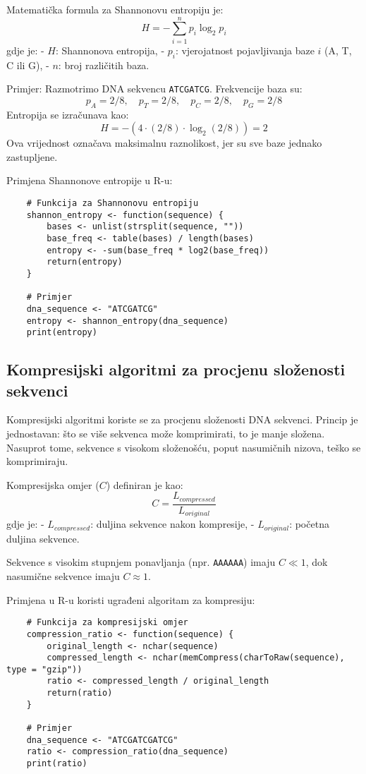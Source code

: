 \documentclass[10pt,a4paper,twoside]{article}
\begin{document}
Matematička formula za Shannonovu entropiju je:
\[
H = -\sum_{i=1}^n p_i \log_2 p_i
\]
gdje je:
- \( H \): Shannonova entropija,
- \( p_i \): vjerojatnost pojavljivanja baze \( i \) (A, T, C ili G),
- \( n \): broj različitih baza.

Primjer: Razmotrimo DNA sekvencu \texttt{ATCGATCG}. Frekvencije baza su:
\[
p_A = 2/8, \quad p_T = 2/8, \quad p_C = 2/8, \quad p_G = 2/8
\]
Entropija se izračunava kao:
\[
H = -(4 \cdot (2/8) \cdot \log_2 (2/8)) = 2
\]
Ova vrijednost označava maksimalnu raznolikost, jer su sve baze jednako zastupljene.

Primjena Shannonove entropije u R-u:
\begin{verbatim}
	# Funkcija za Shannonovu entropiju
	shannon_entropy <- function(sequence) {
		bases <- unlist(strsplit(sequence, ""))
		base_freq <- table(bases) / length(bases)
		entropy <- -sum(base_freq * log2(base_freq))
		return(entropy)
	}
	
	# Primjer
	dna_sequence <- "ATCGATCG"
	entropy <- shannon_entropy(dna_sequence)
	print(entropy)
\end{verbatim}

\subsection*{Kompresijski algoritmi za procjenu složenosti sekvenci}

Kompresijski algoritmi koriste se za procjenu složenosti DNA sekvenci. Princip je jednostavan: što se više sekvenca može komprimirati, to je manje složena. Nasuprot tome, sekvence s visokom složenošću, poput nasumičnih nizova, teško se komprimiraju.

Kompresijska omjer (\( C \)) definiran je kao:
\[
C = \frac{L_{compressed}}{L_{original}}
\]
gdje je:
- \( L_{compressed} \): duljina sekvence nakon kompresije,
- \( L_{original} \): početna duljina sekvence.

Sekvence s visokim stupnjem ponavljanja (npr. \texttt{AAAAAA}) imaju \( C \ll 1 \), dok nasumične sekvence imaju \( C \approx 1 \).

Primjena u R-u koristi ugrađeni algoritam za kompresiju:
\begin{verbatim}
	# Funkcija za kompresijski omjer
	compression_ratio <- function(sequence) {
		original_length <- nchar(sequence)
		compressed_length <- nchar(memCompress(charToRaw(sequence), type = "gzip"))
		ratio <- compressed_length / original_length
		return(ratio)
	}
	
	# Primjer
	dna_sequence <- "ATCGATCGATCG"
	ratio <- compression_ratio(dna_sequence)
	print(ratio)
\end{verbatim}
\end{document}
